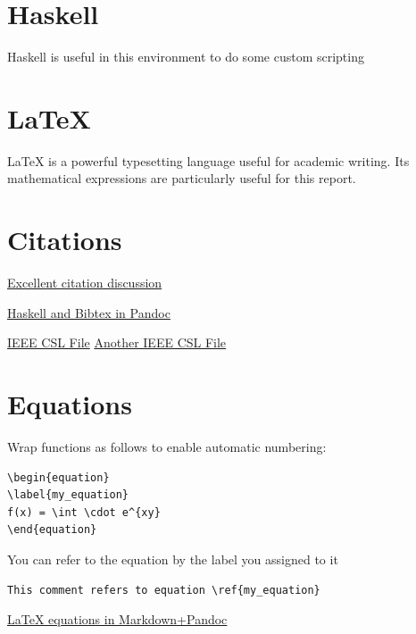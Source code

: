 \documentclass[]{book}
\begin{document}
\section{Haskell}\label{haskell}

Haskell is useful in this environment to do some custom scripting

\section{LaTeX}\label{latex}

LaTeX is a powerful typesetting language useful for academic writing.
Its mathematical expressions are particularly useful for this report.

\section{Citations}\label{citations}

\href{http://www.chriskrycho.com/2015/academic-markdown-and-citations.html}{Excellent
citation discussion}

\href{http://blog.wuzzeb.org/posts/2012-06-15-bibtex-and-pandoc.html}{Haskell
and Bibtex in Pandoc}

\href{https://gist.github.com/marcelofernandez/3264858}{IEEE CSL File}
\href{https://gist.github.com/dnguyen85/d41b0f0bba387c1c31b7}{Another
IEEE CSL File}

\section{Equations}\label{equations}

Wrap functions as follows to enable automatic numbering:

\begin{verbatim}
\begin{equation}
\label{my_equation}
f(x) = \int \cdot e^{xy}
\end{equation}
\end{verbatim}

You can refer to the equation by the label you assigned to it

\begin{verbatim}
This comment refers to equation \ref{my_equation}
\end{verbatim}

\href{http://stackoverflow.com/questions/25042901/how-to-use-latex-equation-environment-in-pandoc-markdown}{LaTeX
equations in Markdown+Pandoc}
\end{document}
